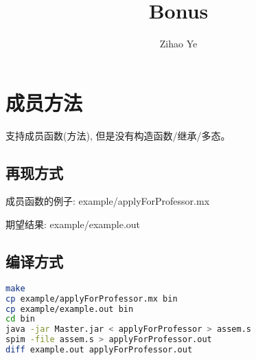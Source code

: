 \documentclass[12pt]{article}
\author{Zihao Ye}
\title{\textbf{Bonus}}
\begin{document}
\maketitle
\section{成员方法} %
\label{sec:成员方法}


支持成员函数(方法), 但是没有构造函数/继承/多态。

\subsection{再现方式} %
\label{sec:再现方式}


成员函数的例子: example/applyForProfessor.mx

\noindent
期望结果: example/example.out

\subsection{编译方式} %
\label{sec:编译方式}


\centering
\begin{lstlisting}[language=bash,
        basicstyle=\small\cons]
make 
cp example/applyForProfessor.mx bin
cp example/example.out bin
cd bin
java -jar Master.jar < applyForProfessor > assem.s
spim -file assem.s > applyForProfessor.out
diff example.out applyForProfessor.out
\end{lstlisting}
\end{document}
